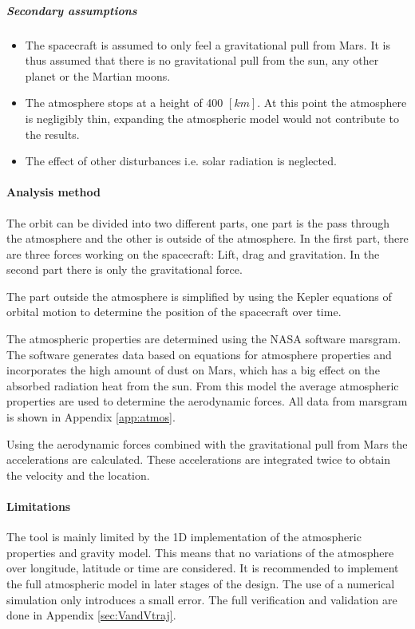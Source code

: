  \subparagraph{Secondary assumptions}
 \begin{itemize}
 \item The spacecraft is assumed to only feel a gravitational pull from Mars. It is thus assumed that there is no gravitational pull from the sun, any other planet or the Martian moons.
 \item The atmosphere stops at a height of 400 $\left[km\right]$. At this point the atmosphere is negligibly thin, expanding the atmospheric model would not contribute to the results.
 \item The effect of other disturbances i.e. solar radiation is neglected.
 \end{itemize}

\paragraph{Analysis method}
The orbit can be divided into two different parts, one part is the pass through the atmosphere and the other is outside of the atmosphere. In the first part, there are three forces working on the spacecraft: Lift, drag and gravitation. In the second part there is only the gravitational force.

The part outside the atmosphere is simplified by using the Kepler equations of orbital motion to determine the position of the spacecraft over time.

The atmospheric properties are determined using the NASA software \gls{marsgram}. The software generates data based on equations for atmosphere properties and incorporates the high amount of dust on Mars, which has a big effect on the absorbed radiation heat from the sun. From this model the average atmospheric properties are used to determine the aerodynamic forces. All data from \gls{marsgram} is shown in Appendix \ref{app:atmos}. 

Using the aerodynamic forces combined with the gravitational pull from Mars the accelerations are calculated. These accelerations are integrated twice to obtain the velocity and the location.

\paragraph{Limitations}
The tool is mainly limited by the 1D implementation of the atmospheric properties and gravity model. This means that no variations of the atmosphere over longitude, latitude or time are considered. It is recommended to implement the full atmospheric model in later stages of the design. The use of a numerical simulation only introduces a small error. The full verification and validation are done in Appendix \ref{sec:VandVtraj}.